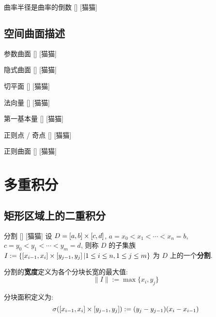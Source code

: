 \documentclass[UTF8]{ctexart}
\begin{document}
			\begin{ppt}
				[]
				{曲率半径是曲率的倒数}
				[]
				[猫猫]
			\end{ppt}

		\subsection{空间曲面描述}
			
			\begin{dfn}
				[]
				{参数曲面}
				[]
				[猫猫]
			\end{dfn}
			
			\begin{dfn}
				[]
				{隐式曲面}
				[]
				[猫猫]
			\end{dfn}
			
			\begin{dfn}
				[]
				{切平面}
				[]
				[猫猫]
			\end{dfn}
			
			\begin{dfn}
				[]
				{法向量}
				[]
				[猫猫]
			\end{dfn}
			
			\begin{dfn}
				[]
				{第一基本量}
				[]
				[猫猫]
			\end{dfn}
			
			\begin{dfn}
				[]
				{正则点 / 奇点}
				[]
				[猫猫]
			\end{dfn}
			
			\begin{dfn}
				[]
				{正则曲面}
				[]
				[猫猫]
			\end{dfn}
	
	\section{多重积分}
		
		\subsection{矩形区域上的二重积分}

			\begin{dfn}
			    []
			    {分割}
			    []
			    [猫猫]
				设 \(D=\Icc{a}{b}\times\Icc{c}{d}\), \(a=x_0<x_1<\cdots<x_n=b\), \(c=y_0<y_1<\cdots<y_m=d\), 则称 \(D\) 的子集族 \(I:=\{\Icc{x_{i-1}}{x_i}\times\Icc{y_{j-1}}{y_j}|1\leq i\leq n, 1\leq j\leq m\}\) 为 \(D\) 上的一个\textbf{分割}. 

				分割的\textbf{宽度}定义为各个分块长宽的最大值: 
				\[\|I\|:=\max\{x_i,y_j\}\]

				分块面积定义为: 
				\[\sigma(\Icc{x_{i-1}}{x_i}\times\Icc{y_{j-1}}{y_j}):=(y_j-y_{j-1})(x_i-x_{i-1})\]
			\end{dfn}
\end{document}
